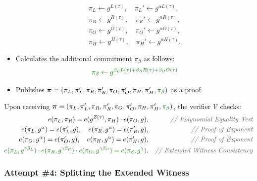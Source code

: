 \documentclass[../lecture-notes.tex]{subfiles}
\begin{document}
\begin{tcolorbox}
\begin{itemize}[label=]
\begin{align*}
            \pi_L \gets g^{L(\tau)}, \quad \pi_L' \gets g^{\alpha L(\tau)}, \\
            \pi_R \gets g^{R(\tau)}, \quad \pi_R' \gets g^{\alpha R(\tau)}, \\
            \pi_O \gets g^{O(\tau)}, \quad \pi_O' \gets g^{\alpha O(\tau)}, \\
            \pi_H \gets g^{H(\tau)}, \quad \pi_H' \gets g^{\alpha H(\tau)}.
        \end{align*}
        \item \textcolor{green!50!black}{Calculates the additional commitment $\pi_{\beta}$ as follows:}
        \begin{equation*}
            \textcolor{green!50!black}{\pi_{\beta} \gets g^{\beta_LL(\tau) + \beta_RR(\tau) + \beta_OO(\tau)}}
        \end{equation*}
        \item Publishes $\boldsymbol{\pi} = (\pi_L,\pi_L',\pi_R,\pi_R',\pi_O,\pi_O',\pi_H,\pi_H',\textcolor{green!50!black}{\pi_{\beta}})$ as a proof.
    \end{itemize}

    Upon receiving $\boldsymbol{\pi} = (\pi_L,\pi_L',\pi_R,\pi_R',\pi_O,\pi_O',\pi_H,\pi_H',\textcolor{green!50!black}{\pi_{\beta}})$, the verifier $\mathcal{V}$ checks:
    \begin{align*}
        e(\pi_L, \pi_R) = e(g^{Z(\tau)}, \pi_H) \cdot e(\pi_O, g),&&\textcolor{gray!80!black}{\textit{// Polynomial Equality Test}} \\
        e(\pi_L, g^{\alpha}) = e(\pi_L', g), \quad e(\pi_R, g^{\alpha}) = e(\pi_R', g),&&\textcolor{gray!80!black}{\textit{// Proof of Exponent}} \\
        e(\pi_O, g^{\alpha}) = e(\pi_O', g), \quad e(\pi_H, g^{\alpha}) = e(\pi_H', g),&&\textcolor{gray!80!black}{\textit{// Proof of Exponent}} \\
        \textcolor{green!50!black}{e(\pi_L, g^{\gamma\beta_L}) \cdot e(\pi_R, g^{\gamma\beta_R}) \cdot e(\pi_O, g^{\gamma\beta_O}) = e(\pi_{\beta}, g^{\gamma})}.&&\textcolor{gray!80!black}{\textit{// Extended Witness Consistency}}
    \end{align*}
\end{tcolorbox}

\subsubsection{Attempt \#4: Splitting the Extended Witness}
\end{document}
